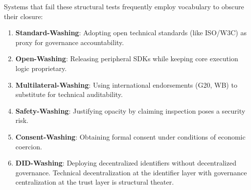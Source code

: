 Systems that fail these structural tests frequently employ vocabulary to obscure their closure:
\begin{enumerate}
    \item \textbf{Standard-Washing}: Adopting open technical standards (like ISO/W3C) as proxy for governance accountability.
    \item \textbf{Open-Washing}: Releasing peripheral SDKs while keeping core execution logic proprietary.
    \item \textbf{Multilateral-Washing}: Using international endorsements (G20, WB) to substitute for technical auditability.
    \item \textbf{Safety-Washing}: Justifying opacity by claiming inspection poses a security risk.
    \item \textbf{Consent-Washing}: Obtaining formal consent under conditions of economic coercion.
    \item \textbf{DID-Washing}: Deploying decentralized identifiers without decentralized governance. Technical decentralization at the identifier layer with governance centralization at the trust layer is structural theater.
\end{enumerate}

